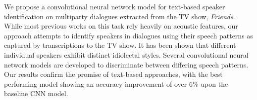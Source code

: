 We propose a convolutional neural network model for text-based speaker identification on multiparty dialogues extracted from the TV show, \emph{Friends}. While most previous works on this task rely heavily on acoustic features, our approach attempts to identify speakers in dialogues using their speech patterns as captured by transcriptions to the TV show. It has been shown that different individual speakers exhibit distinct idiolectal styles. Several convolutional neural network models are developed to discriminate between differing speech patterns. Our results confirm the promise of text-based approaches, with the best performing model showing an accuracy improvement of over 6\% upon the baseline CNN model.
